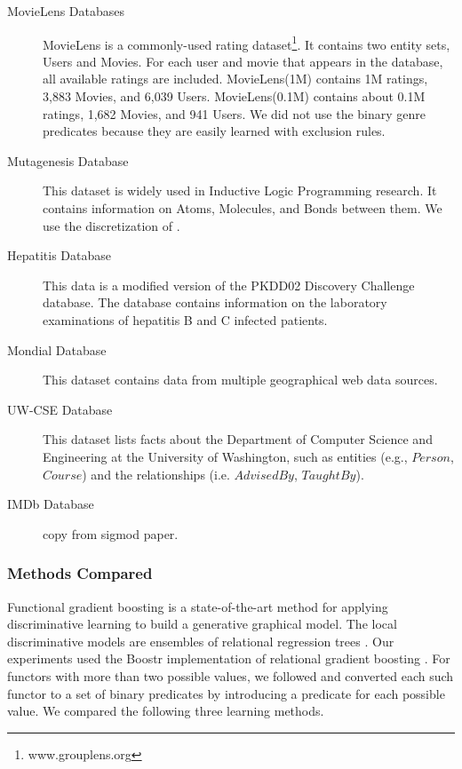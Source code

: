 \documentclass[runningheads,a4paper]{llncs}
\begin{document}
\begin{description}

\item[MovieLens Databases] MovieLens is a  commonly-used rating dataset\footnote {www.grouplens.org}. %
It contains two entity sets, Users and Movies. For each user and movie that appears in the database, all available ratings are included. MovieLens(1M) contains 1M ratings, 3,883 Movies, and 6,039 Users. MovieLens(0.1M) contains about 0.1M ratings, 1,682 Movies, and 941 Users. We did not use the binary genre predicates because they are easily learned with exclusion rules.


\item[Mutagenesis Database] This dataset is widely used in Inductive Logic Programming research. 
It contains information on Atoms, Molecules, and Bonds between them. We use the discretization of \cite{Schulte2012}.

\item[Hepatitis Database] This data is a modified version of the PKDD02 Discovery Challenge database. %
The database contains information on the laboratory examinations of hepatitis B and C infected patients. 

\item[Mondial Database] 
This dataset contains data from multiple geographical web data sources. 

\item[UW-CSE Database] This dataset lists facts about the Department of Computer Science and Engineering at the University of Washington, such as entities (e.g., $Person$, $Course$) and the relationships (i.e. $AdvisedBy$, $TaughtBy$).

\item[IMDb Database] copy from sigmod paper.
\end{description}

\subsubsection{Methods Compared} Functional gradient boosting is a state-of-the-art method for applying discriminative learning to build a generative graphical model. The local discriminative models are  ensembles of relational regression trees \cite{Khot2011}. Our experiments used the Boostr implementation of relational gradient boosting \cite{Khot2013}. For functors with more than two possible values, we followed \cite{Khot2011} and converted each such functor to a set of binary predicates by introducing a predicate for each possible value.
%
We compared the following three learning methods.
\end{document}
